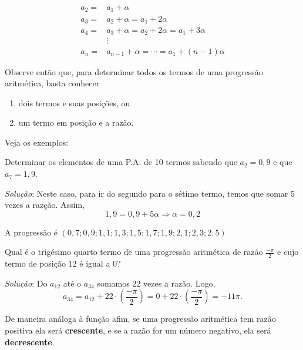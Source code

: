\begin{align*}
a_2=&a_1+\alpha\\
a_3=&a_2+\alpha=a_1+2\alpha\\
a_4=&a_3+\alpha=a_2+2\alpha=a_1+3\alpha\\
&\vdots\\
a_n=&a_{n-1}+\alpha=\cdots=a_1+(n-1)\alpha
\end{align*}

Observe então que, para determinar todos os termos de uma progressão aritmética, basta conhecer
\begin{enumerate}
\item dois termos e suas posições, ou
\item um termo em posição e a razão.
\end{enumerate}
Veja os exemplos:

\begin{example}{}
Determinar os elementos de uma P.A. de 10 termos sabendo que $a_2=0{,}9$ e que $a_7=1{,}9$.

\textit{Solução}: Neste caso, para ir do segundo para o sétimo termo, temos que somar 5 vezes a razção. Assim,
\begin{equation*}
1{,}9=0{,}9+5\alpha\Rightarrow\alpha=0{,}2
\end{equation*}

A progressão é $(0{,}7;0{,}9;1{,}1;1{,}3;1{,}5;1{,}7;1{,}9;2{,}1;2{,}3;2{,}5)$
\end{example}
\begin{example}{}
Qual é o trigésimo quarto termo de uma progressão aritmética de razão $\displaystyle\frac{-\pi}{2}$ e cujo termo de posição $12$ é igual a $0$?

\textit{Solução}: Do $a_12$ até o $a_34$ somamos $22$ vezes a razão. Logo,
\begin{equation*}
a_{34}=a_12+22\cdot(\frac{-\pi}{2})=0+22\cdot(\frac{-\pi}{2})=-11\pi.
\end{equation*}
\end{example}

\begin{observation}
De maneira análoga à função afim, se uma progressão aritmética tem razão positiva ela será \textbf{crescente}, e se a razão for um número negativo, ela será \textbf{decrescente}.
\end{observation}

